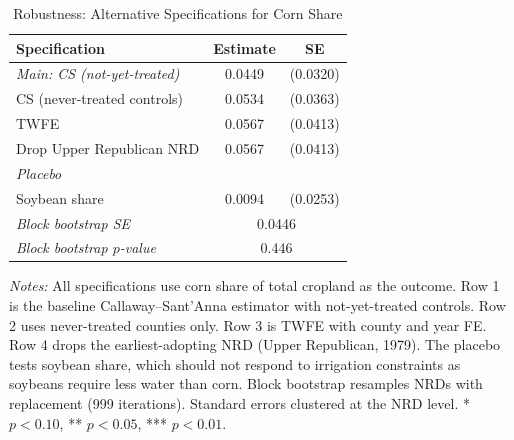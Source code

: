 \begin{table}[H]
\centering
\caption{Robustness: Alternative Specifications for Corn Share}
\label{tab:robustness}
\begin{threeparttable}
\begin{tabular}{lcc}
\toprule
Specification & Estimate & SE \\
\midrule
\textit{Main: CS (not-yet-treated)} & 0.0449 & (0.0320) \\
CS (never-treated controls) & 0.0534 & (0.0363) \\
TWFE & 0.0567 & (0.0413) \\
Drop Upper Republican NRD & 0.0567 & (0.0413) \\
\midrule
\multicolumn{3}{l}{\textit{Placebo}} \\
Soybean share & 0.0094 & (0.0253) \\
\midrule
\textit{Block bootstrap SE} & \multicolumn{2}{c}{0.0446} \\
\textit{Block bootstrap $p$-value} & \multicolumn{2}{c}{0.446} \\
\bottomrule
\end{tabular}
\begin{tablenotes}[flushleft]
\small
\item \textit{Notes:} All specifications use corn share of total cropland as the outcome. Row 1 is the baseline Callaway--Sant'Anna estimator with not-yet-treated controls. Row 2 uses never-treated counties only. Row 3 is TWFE with county and year FE. Row 4 drops the earliest-adopting NRD (Upper Republican, 1979). The placebo tests soybean share, which should not respond to irrigation constraints as soybeans require less water than corn. Block bootstrap resamples NRDs with replacement (999 iterations). Standard errors clustered at the NRD level. * $p<0.10$, ** $p<0.05$, *** $p<0.01$.
\end{tablenotes}
\end{threeparttable}
\end{table}
